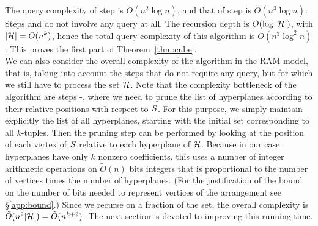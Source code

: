The query complexity of step  is $O(n^2 \log n)$, and that of step
 is $O(n^3 \log n)$. Steps  and  do not involve any
query at all. The recursion depth is $O(\log |{\mathcal{H}}|)$, with $|\mathcal{H}|=O(n^k)$,
hence the total query complexity of this algorithm is $O(n^3 \log^2 n)$. This
proves the first part of Theorem~\ref{thm:cube}.\\

We can also consider the overall complexity of the algorithm in the RAM model,
that is, taking into account the steps that do not require any query, but for
which we still have to process the set $\mathcal{H}$. Note that the complexity
bottleneck of the algorithm are steps -, where we need to prune
the list of hyperplanes according to their relative positions with respect to
$S$. For this purpose, we simply maintain explicitly the list of all
hyperplanes, starting with the initial set corresponding to all $k$-tuples.
Then the pruning step can be performed by looking at the position of each
vertex of $S$ relative to each hyperplane of $\mathcal{H}$.
Because in our case hyperplanes have only $k$ nonzero coefficients, this uses a
number of integer arithmetic operations on $\tilde{O}(n)$ bits integers that is
proportional to the number of vertices times the number of hyperplanes.
(For the justification of the bound on the number of bits needed to represent
vertices of the arrangement see \S\ref{app:bound}.)
Since we recurse on a fraction of the set, the overall complexity is
$\tilde{O}(n^2|{\mathcal{H}}|) = \tilde{O}(n^{k+2})$. The next section is devoted
to improving this running time.


